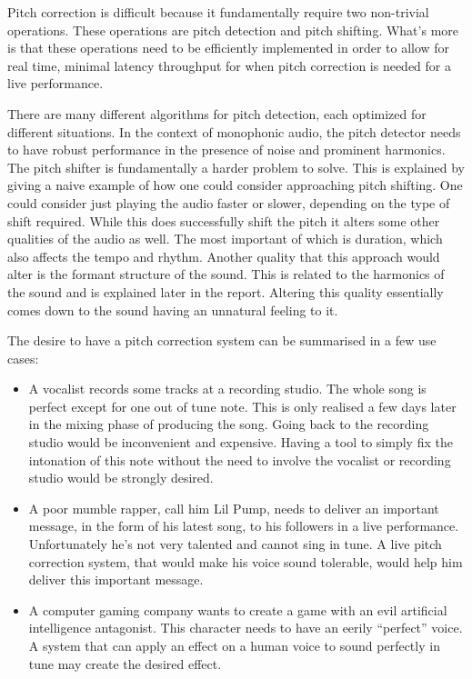 Pitch correction is difficult because it fundamentally require two non-trivial
operations. These operations are pitch detection and pitch shifting. What's more
is that these operations need to be efficiently implemented in order to allow for
real time, minimal latency throughput for when pitch correction is needed for a
live performance.

There are many different algorithms for pitch detection, each optimized for
different situations. In the context of monophonic audio, the pitch detector needs
to have robust performance in the presence of noise and prominent harmonics. The
pitch shifter is fundamentally a harder problem to solve. This is explained by
giving a naive example of how one could consider approaching pitch shifting.  One
could consider just playing the audio faster or slower, depending on the type of
shift required. While this does successfully shift the pitch it alters some other
qualities of the audio as well. The most important of which is duration, which
also affects the tempo and rhythm. Another quality that this approach would alter
is the formant structure of the sound. This is related to the harmonics of the
sound and is explained later in the report. Altering this quality essentially
comes down to the sound having an unnatural feeling to it.

\vspace{4mm}\noindent
The desire to have a pitch correction system can be summarised in a few use cases:
\begin{itemize}
\item
A vocalist records some tracks at a recording studio. The whole song is perfect
except for one out of tune note. This is only realised a few days later in the
mixing phase of producing the song. Going back to the recording studio would be
inconvenient and expensive. Having a tool to simply fix the intonation of this
note without the need to involve the vocalist or recording studio would be
strongly desired.
\item
A poor mumble rapper, call him Lil Pump, needs to deliver an important message, in
the form of his latest song, to his followers in a live performance. Unfortunately
he's not very talented and cannot sing in tune. A live pitch correction system,
that would make his voice sound tolerable, would help him deliver this important
message.
\item
A computer gaming company wants to create a game with an evil artificial
intelligence antagonist. This character needs to have an eerily ``perfect'' voice.
A system that can apply an effect on a human voice to sound perfectly in tune may
create the desired effect.
\end{itemize}


